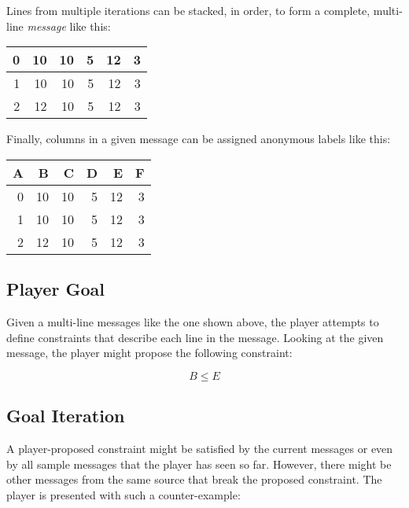 \documentclass[12pt]{article}
\begin{document}
Lines from multiple iterations can be stacked, in order, to form a complete, multi-line {\it message} like this:


\begin{center}

\begin{tabular}{|r|r|r|r|r|r|}
\hline

0&10&10&5&12&3\\
\hline
\hline
1&10&10&5&12&3\\
\hline
\hline
2&12&10&5&12&3\\
\hline
\end{tabular}

\end{center}



Finally, columns in a given message can be assigned anonymous labels like this:


\begin{center}

\begin{tabular}{|r|r|r|r|r|r|}

{\bf A}&\bf B&\bf C&\bf D&\bf E&\bf F\\

\hline
\hline
0&10&10&5&12&3\\
\hline
\hline
1&10&10&5&12&3\\
\hline
\hline
2&12&10&5&12&3\\
\hline
\end{tabular}

\end{center}


\subsection{Player Goal}

Given a multi-line messages like the one shown above, the player attempts to define constraints that describe each line in the message.  Looking at the given message, the player might propose the following constraint:

\[
B \leq E
\]

\subsection{Goal Iteration}

A player-proposed constraint might be satisfied by the current messages or even by all sample messages that the player has seen so far.  However, there might be other messages from the same source that break the proposed constraint.  The player is presented with such a counter-example:
\end{document}
